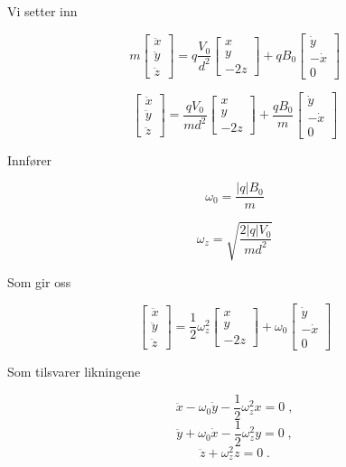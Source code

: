 \documentclass[reprint,english,notitlepage, nofootinbib]{revtex4-1}  %
\begin{document}
Vi setter inn

$$ m \begin{bmatrix} \ddot{x} \\ \ddot{y} \\ \ddot{z} \end{bmatrix} = q \frac{V_0}{d^2} \begin{bmatrix}
x \\ y \\ -2z 
\end{bmatrix} + q B_0 \begin{bmatrix}
\dot{y} \\ -\dot{x} \\ 0
\end{bmatrix}$$

$$\begin{bmatrix} \ddot{x} \\ \ddot{y} \\ \ddot{z} \end{bmatrix} = \frac{qV_0}{md^2} \begin{bmatrix}
x \\ y \\ -2z 
\end{bmatrix} + \frac{qB_0}{m} \begin{bmatrix}
\dot{y} \\ -\dot{x} \\ 0
\end{bmatrix}$$ 

Innfører 

$$\omega_0 = \frac{|q|B_0}{m}$$

$$ \omega_z = \sqrt{\frac{2|q|V_0}{md^2}}$$

Som gir oss

$$\begin{bmatrix} \ddot{x} \\ \ddot{y} \\ \ddot{z} \end{bmatrix} = \frac{1}{2}\omega_z^2 \begin{bmatrix}
x \\ y \\ -2z 
\end{bmatrix} + \omega_0 \begin{bmatrix}
\dot{y} \\ -\dot{x} \\ 0
\end{bmatrix}$$ 

Som tilsvarer likningene

$$
\ddot{x} - \omega_0 \dot{y} - \frac{1}{2}\omega_z^2 x = 0 \; ,
$$
$$\ddot{y} + \omega_0 \dot{x} - \frac{1}{2}\omega_z^2 y = 0 \; ,
$$
$$\ddot{z} + \omega_z^2 z = 0 \; .
$$
\end{document}
